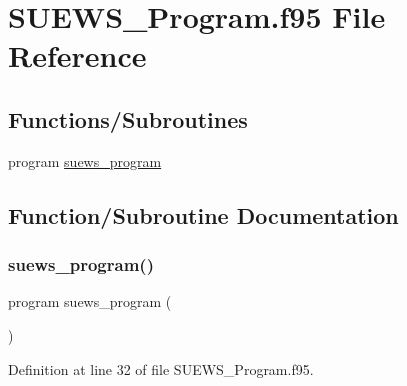 \hypertarget{_s_u_e_w_s___program_8f95}{}\section{S\+U\+E\+W\+S\+\_\+\+Program.\+f95 File Reference}
\label{_s_u_e_w_s___program_8f95}
\subsection*{Functions/\+Subroutines}
\begin{DoxyCompactItemize}
\item 
program \hyperlink{_s_u_e_w_s___program_8f95_af3ded34edb3421ec79e0e64b46b76542}{suews\+\_\+program}
\end{DoxyCompactItemize}


\subsection{Function/\+Subroutine Documentation}
\mbox{\label{_s_u_e_w_s___program_8f95_af3ded34edb3421ec79e0e64b46b76542}} 
\subsubsection{\texorpdfstring{suews\+\_\+program()}{suews\_program()}}
{\footnotesize\ttfamily program suews\+\_\+program (\begin{DoxyParamCaption}{ }\end{DoxyParamCaption})}



Definition at line 32 of file S\+U\+E\+W\+S\+\_\+\+Program.\+f95.

